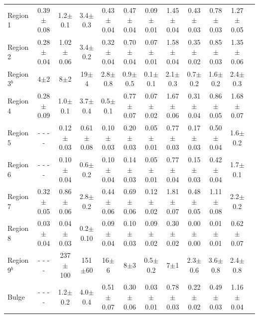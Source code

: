 \documentclass[useAMS,usenatbib,a4paper]{mn2e}
\begin{document}
\begin{table}
\begin{minipage}{200mm}
\begin{tabular}{l c c  c  c  c  c  c  c  c  c c }
 Region 1 &0.39$\pm$0.08        & 1.2$\pm$0.1             & 3.4$\pm$0.3        & 0.43$\pm$0.04        & 0.47$\pm$0.04        & 0.09$\pm$0.01        & 1.45$\pm$0.04        & 0.43$\pm$0.03        & 0.78$\pm$0.03              & 1.27$\pm$0.05        \\
 Region 2 &0.28$\pm$0.04        & 1.02$\pm$0.06        & 3.4$\pm$0.2        & 0.32$\pm$0.04        & 0.70$\pm$0.04        & 0.07$\pm$0.01        & 1.58$\pm$0.04        & 0.35$\pm$0.02        & 0.85$\pm$0.03              & 1.35$\pm$0.06        \\
 Region 3$^b$ &4$\pm$2           & 8$\pm$2                   & 19$\pm$4            & 2.8$\pm$0.8             & 0.9$\pm$0.5             & 0.1$\pm$0.1            & 2.1$\pm$0.3             & 0.7$\pm$0.2            & 1.6$\pm$0.2                   & 2.4$\pm$0.3        \\
 Region 4 &0.28$\pm$0.09        & 1.0$\pm$0.1             & 3.7$\pm$0.4       & 0.5$\pm$0.1              & 0.77$\pm$0.07        & 0.07$\pm$0.02        & 1.67$\pm$0.06        & 0.31$\pm$0.04        & 0.86$\pm$0.05             & 1.68$\pm$0.07        \\
 Region 5 & - - - -        & 0.12$\pm$0.03        & 0.61$\pm$0.08   & 0.10$\pm$0.03        & 0.20$\pm$0.03        & 0.05$\pm$0.01        & 0.77$\pm$0.03        & 0.17$\pm$0.03        & 0.50$\pm$0.04            & 1.6$\pm$0.2        \\
 Region 6 & - - - -                          & 0.10$\pm$0.04        & 0.6$\pm$0.2        & 0.10$\pm$0.04        & 0.14$\pm$0.03        & 0.05$\pm$0.01        & 0.77$\pm$0.04        & 0.15$\pm$0.03        & 0.42$\pm$0.04            & 1.7$\pm$0.1        \\
 Region 7 &0.32$\pm$0.05        & 0.86$\pm$0.06        & 2.8$\pm$0.2        & 0.44$\pm$0.06        & 0.69$\pm$0.06        & 0.12$\pm$0.02        & 1.81$\pm$0.07        & 0.48$\pm$0.05        & 1.11$\pm$0.08            & 2.2$\pm$0.2        \\
 Region 8 &0.03$\pm$0.04        & 0.04$\pm$0.03        & 0.2$\pm$0.10      & 0.09$\pm$0.04        & 0.10$\pm$0.03        & 0.09$\pm$0.02        & 0.30$\pm$0.02        & 0.00$\pm$0.00        & 0.01$\pm$0.01            & 0.62$\pm$0.07        \\
 Region 9$^b$ & - - - -                 & 237$\pm$100          & 151$\pm$60        & 16$\pm$6                 & 8$\pm$3                   & 0.5$\pm$0.2             & 7$\pm$1                   & 2.3$\pm$0.6             & 3.6$\pm$0.8                 & 2.4$\pm$0.8  \\
 Bulge       & - - - -                          & 1.2$\pm$0.2            & 4.0$\pm$0.4        & 0.51$\pm$0.07         & 0.30$\pm$0.06        & 0.03$\pm$0.01        & 0.78$\pm$0.03        & 0.22$\pm$0.02        & 0.49$\pm$0.03            & 1.16$\pm$0.04 \\       



\end{tabular}
\end{minipage}
\end{table}
\end{document}
